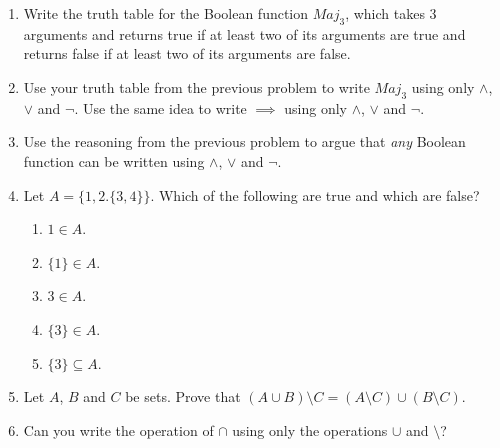 \documentclass[12pt]{report}
\theoremstyle{definition}
\begin{document}
\begin{enumerate}
	\item Write the truth table for the Boolean function $Maj_3$, which takes 3 arguments and returns true if at least two of its arguments are true and returns false if at least two of its arguments are false.

	\vfill

	\item Use your truth table from the previous problem to write $Maj_3$ using only $\land$, $\lor$ and $\neg$. Use the same idea to write $\implies$ using only $\land$, $\lor$ and $\neg$.

	\vfill

	\item Use the reasoning from the previous problem to argue that \emph{any} Boolean function can be written using $\land$, $\lor$ and $\neg$.

	\vfill 

	\pagebreak

	\item Let $A = \{1, 2. \{3, 4\}\}$. Which of the following are true and which are false?
	\begin{enumerate}
		\item $1\in A$.
		\item $\{1\}\in A$.
		\item $3\in A$.
		\item $\{3\}\in A$.
		\item $\{3\}\subseteq A$.
	\end{enumerate}

	\vfill

	\item Let $A$, $B$ and $C$ be sets. Prove that $(A\cup B)\setminus C = (A\setminus C)\cup (B\setminus C)$.
	\vfill

	\item Can you write the operation of $\cap$ using only the operations $\cup$ and $\setminus$?
	\vfill

\end{enumerate}
\end{document}
